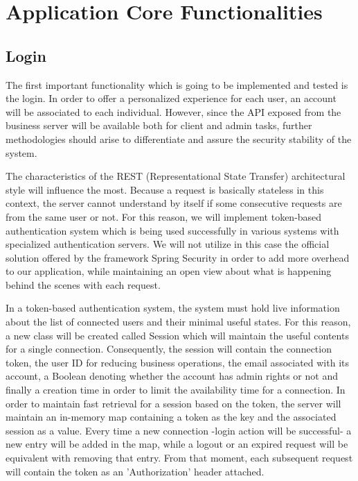 \section{Application Core Functionalities}

\subsection{Login}
The first important functionality which is going to be implemented and tested is the login. In order to offer a personalized experience for each user, an account will be associated to each individual. However, since the API exposed from the business server will be available both for client and admin tasks, further methodologies should arise to differentiate and assure the security stability of the system.

The characteristics of the REST (Representational State Transfer) architectural style will influence the most. Because a request is basically stateless in this context, the server cannot understand by itself if some consecutive requests are from the same user or not. For this reason, we will implement token-based authentication system which is being used successfully in various systems with specialized authentication servers. We will not utilize in this case the official solution offered by the framework Spring Security in order to add more overhead to our application, while maintaining an open view about what is happening behind the scenes with each request.

In a token-based authentication system, the system must hold live information about the list of connected users and their minimal useful states. For this reason, a new class will be created called Session which will maintain the useful contents for a single connection. Consequently, the session will contain the connection token, the user ID for reducing business operations, the email associated with its account, a Boolean denoting whether the account has admin rights or not and finally a creation time in order to limit the availability time for a connection. In order to maintain fast retrieval for a session based on the token, the server will maintain an in-memory map containing a token as the key and the associated session as a value. Every time a new connection -login action will be successful- a new entry will be added in the map, while a logout or an expired request will be equivalent with removing that entry. From that moment, each subsequent request will contain the token as an 'Authorization' header attached.


